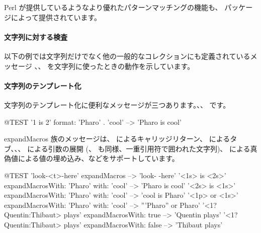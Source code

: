 \documentclass[a4paper,10pt,twoside]{book}
\begin{document}
Perl が提供しているようなより優れたパターンマッチングの機能も、 パッケージによって提供されています。

\paragraph{文字列に対する検査} 以下の例では文字列だけでなく他の一般的なコレクションにも定義されているメッセージ \mbox{、}、 を文字列に使ったときの動作を示しています。


\paragraph{文字列のテンプレート化}
文字列のテンプレート化に便利なメッセージが三つあります。、、 です。

\begin{code}{@TEST}
'{1} is {2}' format: {'Pharo' . 'cool'}  --> 'Pharo is cool'
\end{code}

expandMacros 族のメッセージは、 によるキャリッジリターン、 によるタブ、、、 による引数の展開 (、 も同様、一重引用符で囲われた文字列)、 による真偽値による値の埋め込み、などをサポートしています。


\begin{code}{@TEST}
'look-<t>-here' expandMacros                                         --> 'look-	-here'
'<1s> is <2s>' expandMacrosWith: 'Pharo' with: 'cool'   --> 'Pharo is cool'
'<2s> is <1s>' expandMacrosWith: 'Pharo' with: 'cool'   --> 'cool is Pharo'
'<1p> or <1s>' expandMacrosWith: 'Pharo' with: 'cool'  --> '''Pharo'' or Pharo'
'<1?Quentin:Thibaut> plays' expandMacrosWith: true     --> 'Quentin plays'
'<1?Quentin:Thibaut> plays' expandMacrosWith: false    --> 'Thibaut plays'
\end{code}
\end{document}
